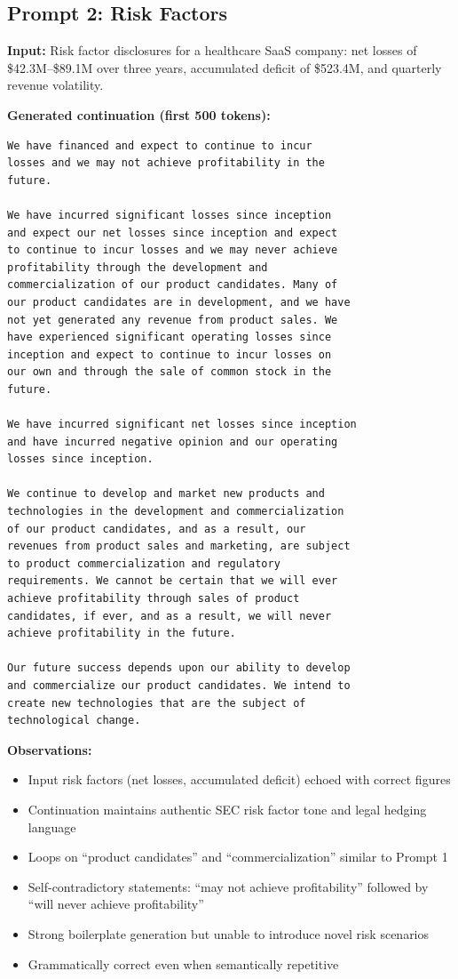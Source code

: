 \documentclass[12pt]{article}
\begin{document}
\subsection{Prompt 2: Risk Factors}

\textbf{Input:} Risk factor disclosures for a healthcare SaaS company: net losses of \$42.3M--\$89.1M over three years, accumulated deficit of \$523.4M, and quarterly revenue volatility.

\textbf{Generated continuation (first 500 tokens):}

\begin{Verbatim}[fontsize=\small]
We have financed and expect to continue to incur
losses and we may not achieve profitability in the
future.

We have incurred significant losses since inception
and expect our net losses since inception and expect
to continue to incur losses and we may never achieve
profitability through the development and
commercialization of our product candidates. Many of
our product candidates are in development, and we have
not yet generated any revenue from product sales. We
have experienced significant operating losses since
inception and expect to continue to incur losses on
our own and through the sale of common stock in the
future.

We have incurred significant net losses since inception
and have incurred negative opinion and our operating
losses since inception.

We continue to develop and market new products and
technologies in the development and commercialization
of our product candidates, and as a result, our
revenues from product sales and marketing, are subject
to product commercialization and regulatory
requirements. We cannot be certain that we will ever
achieve profitability through sales of product
candidates, if ever, and as a result, we will never
achieve profitability in the future.

Our future success depends upon our ability to develop
and commercialize our product candidates. We intend to
create new technologies that are the subject of
technological change.
\end{Verbatim}

\textbf{Observations:}
\begin{itemize}
    \item Input risk factors (net losses, accumulated deficit) echoed with correct figures
    \item Continuation maintains authentic SEC risk factor tone and legal hedging language
    \item Loops on ``product candidates'' and ``commercialization'' similar to Prompt 1
    \item Self-contradictory statements: ``may not achieve profitability'' followed by ``will never achieve profitability''
    \item Strong boilerplate generation but unable to introduce novel risk scenarios
    \item Grammatically correct even when semantically repetitive
\end{itemize}
\end{document}
